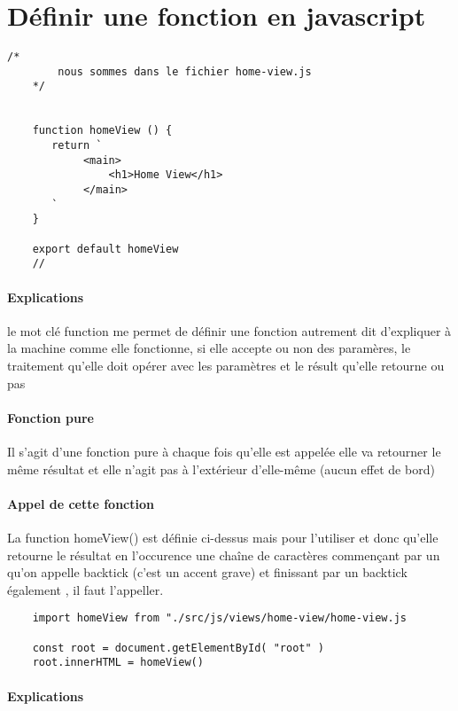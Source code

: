 \documentclass[a4paper, 12pt]{report}
\begin{document}
\section[short]{Définir une fonction en javascript}

\begin{lstlisting}[style=mainlststyle]
    /* 
        nous sommes dans le fichier home-view.js
    */

    
    function homeView () {
       return `
            <main>
                <h1>Home View</h1>
            </main>
       `
    }

    export default homeView
    // 

\end{lstlisting}

\paragraph{Explications}

le mot clé function me permet de définir une fonction autrement dit d'expliquer à la machine comme elle fonctionne, si elle accepte ou non des paramères, le traitement qu'elle doit opérer avec les paramètres et le résult qu'elle retourne ou pas

\paragraph{Fonction pure}
Il s'agit d'une fonction pure à chaque fois qu'elle est appelée elle va retourner le même résultat et elle n'agit pas à l'extérieur d'elle-même (aucun effet de bord)

\paragraph{Appel de cette fonction}
La function homeView() est définie ci-dessus mais pour l'utiliser et donc qu'elle retourne le résultat en l'occurence une chaîne de caractères commençant par un \texttt{\textasciigrave} qu'on appelle backtick (c'est un accent grave) et finissant par un backtick également \texttt{\textasciigrave}, il faut l'appeller.


\begin{verbatim}
    import homeView from "./src/js/views/home-view/home-view.js

    const root = document.getElementById( "root" )
    root.innerHTML = homeView()
\end{verbatim}

\paragraph{Explications}
\end{document}
